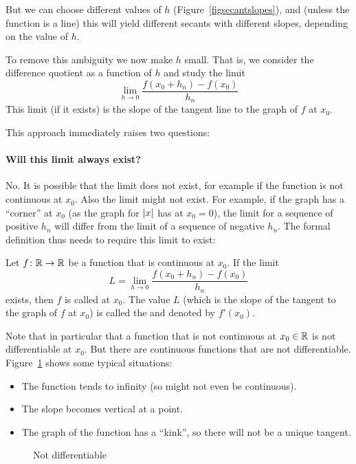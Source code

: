 But we can choose different values of $h$ (Figure~\ref{figsecantslopes}),
and (unless the function is a line) this will yield different secants with
different slopes, depending on the value of $h$.

To remove this ambiguity we now make $h$ small. That is, we consider
the difference quotient as a function of $h$ and study the limit
\[
\lim_{h\to 0}\frac{f(x_0+h_n)-f(x_0)}{h_n}
\]
This limit (if it exists) is the slope of the tangent line to the graph of
$f$ at $x_0$.
\smallskip

This approach immediately raises two questions:

\paragraph{Will this limit always exist?} No. It is possible that the limit
does not exist, for example if the function is not continuous at $x_0$. Also
the limit might not exist.
For example, if the graph
has a ``corner'' at $x_0$ (as the graph for $\left|x\right|$ has at $x_0=0$), the
limit for a sequence of positive $h_n$ will differ from the limit of a
sequence of negative $h_n$. The formal definition thus needs to require this
limit to exist:

\begin{defn}
Let $f\colon{\mathbb R}\to{\mathbb R}$ be a function that is continuous at $x_0$. If the limit
\[
L=\lim_{h\to 0}\frac{f(x_0+h_n)-f(x_0)}{h_n}
\]
exists, then
$f$ is called  at $x_0$. The value $L$ (which is the
slope of the tangent to the graph of $f$ at $x_0$) is called the
 and denoted by $f'(x_0)$.
\end{defn}
Note that in particular that a function that is not continuous at $x_0\in{\mathbb R}$
is not differentiable at $x_0$. But there are continuous functions that are
not differentiable. Figure~\ref{fiUndifferentiable} shows some typical situations:
\begin{itemize}
\item The function tends to infinity (so might not even be continuous).
\item The slope becomes vertical at a point.
\item The graph of the function has a ``kink'', so there will not be a
unique tangent.
\end{itemize}
\begin{figure}[t]
\begin{center}
\end{center}
\caption{Not differentiable}
\label{fiUndifferentiable}
\end{figure}

